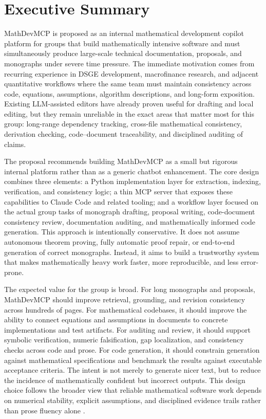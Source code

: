 \chapter{Executive Summary}

MathDevMCP is proposed as an internal mathematical development copilot platform for groups that build mathematically intensive software and must simultaneously produce large-scale technical documentation, proposals, and monographs under severe time pressure. The immediate motivation comes from recurring experience in DSGE development, macrofinance research, and adjacent quantitative workflows where the same team must maintain consistency across code, equations, assumptions, algorithm descriptions, and long-form exposition. Existing LLM-assisted editors have already proven useful for drafting and local editing, but they remain unreliable in the exact areas that matter most for this group: long-range dependency tracking, cross-file mathematical consistency, derivation checking, code--document traceability, and disciplined auditing of claims.

The proposal recommends building MathDevMCP as a small but rigorous internal platform rather than as a generic chatbot enhancement. The core design combines three elements: a Python implementation layer for extraction, indexing, verification, and consistency logic; a thin MCP server that exposes these capabilities to Claude Code and related tooling; and a workflow layer focused on the actual group tasks of monograph drafting, proposal writing, code-document consistency review, documentation auditing, and mathematically informed code generation. This approach is intentionally conservative. It does not assume autonomous theorem proving, fully automatic proof repair, or end-to-end generation of correct monographs. Instead, it aims to build a trustworthy system that makes mathematically heavy work faster, more reproducible, and less error-prone.

The expected value for the group is broad. For long monographs and proposals, MathDevMCP should improve retrieval, grounding, and revision consistency across hundreds of pages. For mathematical codebases, it should improve the ability to connect equations and assumptions in documents to concrete implementations and test artifacts. For auditing and review, it should support symbolic verification, numeric falsification, gap localization, and consistency checks across code and prose. For code generation, it should constrain generation against mathematical specifications and benchmark the results against executable acceptance criteria. The intent is not merely to generate nicer text, but to reduce the incidence of mathematically confident but incorrect outputs. This design choice follows the broader view that reliable mathematical software work depends on numerical stability, explicit assumptions, and disciplined evidence trails rather than prose fluency alone \citep{higham2002,mackay2003}.

